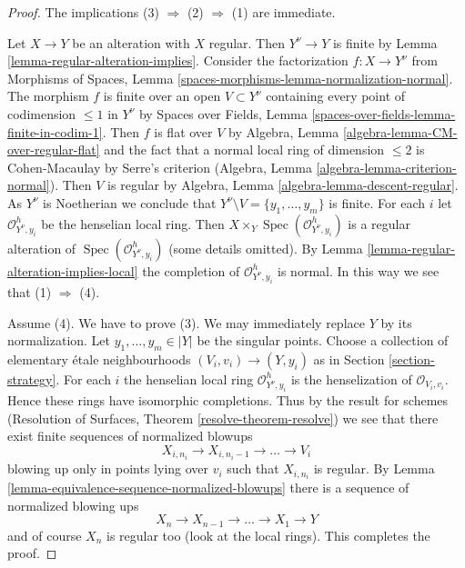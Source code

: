 \documentclass{stacks-project}
\theoremstyle{plain}
\theoremstyle{definition}
\theoremstyle{remark}
\numberwithin{equation}{subsection}
\def\Spec{\mathop{\mathrm{Spec}}}
\begin{document}
\begin{proof}
The implications (3) $\Rightarrow$ (2) $\Rightarrow$ (1) are immediate.

\medskip\noindent
Let $X \to Y$ be an alteration with $X$ regular. Then $Y^\nu \to Y$
is finite by Lemma \ref{lemma-regular-alteration-implies}.
Consider the factorization $f : X \to Y^\nu$ from 
Morphisms of Spaces, Lemma \ref{spaces-morphisms-lemma-normalization-normal}.
The morphism $f$ is finite over an open $V \subset Y^\nu$ containing
every point of codimension $\leq 1$ in $Y^\nu$
by Spaces over Fields, Lemma \ref{spaces-over-fields-lemma-finite-in-codim-1}.
Then $f$ is flat over $V$ by
Algebra, Lemma \ref{algebra-lemma-CM-over-regular-flat}
and the fact that a normal local ring
of dimension $\leq 2$ is Cohen-Macaulay by Serre's criterion
(Algebra, Lemma \ref{algebra-lemma-criterion-normal}).
Then $V$ is regular by Algebra, Lemma \ref{algebra-lemma-descent-regular}.
As $Y^\nu$ is Noetherian we conclude that
$Y^\nu \setminus V = \{y_1, \ldots, y_m\}$ is finite.
For each $i$ let $\mathcal{O}_{Y^\nu, y_i}^h$ be the henselian
local ring. Then $X \times_Y \Spec(\mathcal{O}_{Y^\nu, y_i}^h)$
is a regular alteration of $\Spec(\mathcal{O}_{Y^\nu, y_i}^h)$
(some details omitted).
By Lemma \ref{lemma-regular-alteration-implies-local}
the completion of $\mathcal{O}_{Y^\nu, y_i}^h$ is normal.
In this way we see that (1) $\Rightarrow$ (4).

\medskip\noindent
Assume (4). We have to prove (3). We may immediately replace
$Y$ by its normalization. Let $y_1, \ldots, y_m \in |Y|$ be the
singular points. Choose a collection of elementary \'etale neighbourhoods
$(V_i, v_i) \to (Y, y_i)$ as in Section \ref{section-strategy}.
For each $i$ the henselian local ring $\mathcal{O}_{Y^\nu, y_i}^h$
is the henselization of $\mathcal{O}_{V_i, v_i}$.
Hence these rings have isomorphic completions.
Thus by the result for schemes
(Resolution of Surfaces, Theorem \ref{resolve-theorem-resolve})
we see that there exist finite sequences of normalized blowups
$$
X_{i, n_i} \to X_{i, n_i - 1} \to \ldots \to V_i
$$
blowing up only in points lying over $v_i$ such that $X_{i, n_i}$
is regular. By Lemma \ref{lemma-equivalence-sequence-normalized-blowups}
there is a sequence of normalized blowing ups
$$
X_n \to X_{n - 1} \to \ldots \to X_1 \to Y
$$
and of course $X_n$ is regular too (look at the local rings).
This completes the proof.
\end{proof}
\end{document}
